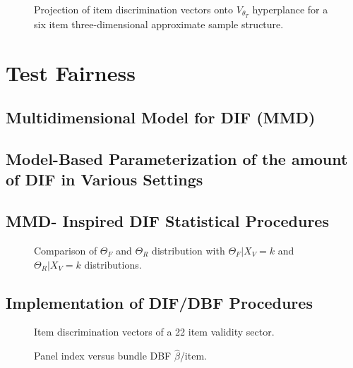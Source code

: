 \documentclass[titlepage,11pt,twoside]{article}
\begin{document}
\begin{figure}[h]
\caption{Projection of item discrimination vectors onto $V_{\theta_T}$ hyperplance for a six item three-dimensional approximate sample structure.}
\end{figure}



\section{Test Fairness}



\subsection{Multidimensional Model for DIF (MMD)}



\subsection{Model-Based Parameterization of the amount of DIF in Various Settings}



\subsection{MMD- Inspired DIF Statistical Procedures}



\begin{figure}[h]
\caption{Comparison of $\Theta_F$ and $\Theta_R $ distribution with $\Theta_F \vert X_V = k$ and $\Theta_R \vert X_V = k$ distributions.}
\end{figure}

\subsection{Implementation of DIF/DBF Procedures}


\begin{figure}[h]
\caption{Item discrimination vectors of a 22 item validity sector.}
\end{figure}



\begin{figure}[h]
\caption{Panel index versus bundle DBF $\hat {\beta}$/item.}
\end{figure}
\end{document}
